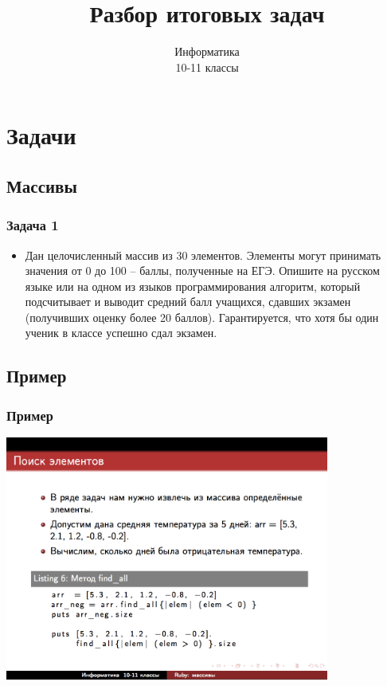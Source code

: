 \documentclass[compress,red]{beamer}
\title{Разбор итоговых задач}
\author{Информатика \\ 10-11 классы}
\begin{document}
\maketitle

\section{Задачи}

\subsection{Массивы}
\begin{frame}[fragile]
  \frametitle{Задача 1}
  \begin{itemize}
    \item Дан целочисленный массив из 30 элементов. Элементы могут принимать значения от 0 до 100 – баллы, полученные на ЕГЭ. Опишите на русском языке или на одном из языков программирования алгоритм, который подсчитывает и выводит средний балл учащихся, сдавших экзамен (получивших оценку более 20 баллов). Гарантируется, что хотя бы один ученик в классе успешно сдал экзамен.
  \end{itemize}
\end{frame}

\subsection{Пример}
\begin{frame}[fragile]
  \frametitle{Пример}
  \centerline{\includegraphics[width=0.8\textwidth]{images/screen1.png}}
\end{frame}
\end{document}
